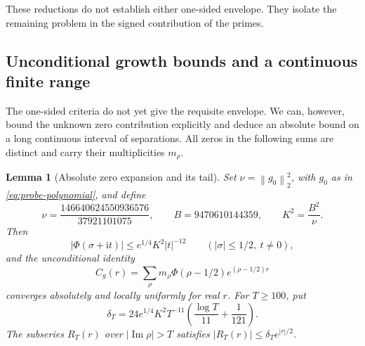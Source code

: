 \documentclass[11pt]{article}
\numberwithin{equation}{section}
\newtheorem{lemma}[theorem]{Lemma}
\theoremstyle{definition}
\theoremstyle{remark}
\newcommand{\Ima}{\operatorname{Im}}
\newcommand{\ii}{\mathrm i}
\newcommand{\norm}[1]{\left\lVert #1\right\rVert}
\begin{document}
These reductions do not establish either one-sided envelope. They
isolate the remaining problem in the signed contribution of the primes.


\subsection{Unconditional growth bounds and a continuous finite range}
\label{sec:probe-unconditional-growth}

The one-sided criteria do not yet give the requisite envelope. We can,
however, bound the unknown zero contribution explicitly and deduce an
absolute bound on a long continuous interval of separations. All zeros in
the following sums are distinct and carry their multiplicities \(m_\rho\).

\begin{lemma}[Absolute zero expansion and its tail]
\label{lem:probe-zero-tail}
Set \(\nu=\norm{g_0}_2^2\), with \(g_0\) as in
\eqref{eq:probe-polynomial}, and define
\begin{equation}\label{eq:probe-tail-constants}
\nu=\frac{146640624550936576}{37921101075},\qquad
B=9470610144359,\qquad K^2=\frac{B^2}{\nu}.
\end{equation}
Then
\begin{equation}\label{eq:probe-transform-decay}
|\Phi(\sigma+\ii t)|\le e^{1/4}K^2|t|^{-12}
\qquad(|\sigma|\le1/2,\ t\ne0),
\end{equation}
and the unconditional identity
\begin{equation}\label{eq:probe-full-covariance}
C_g(r)=\sum_\rho m_\rho\Phi(\rho-1/2)e^{(\rho-1/2)r}
\end{equation}
converges absolutely and locally uniformly for real \(r\).
For \(T\ge100\), put
\begin{equation}\label{eq:probe-delta-tail}
\delta_T=24e^{1/4}K^2T^{-11}
\left(\frac{\log T}{11}+\frac1{121}\right).
\end{equation}
The subseries \(R_T(r)\) over \(|\Ima\rho|>T\) satisfies
\(|R_T(r)|\le\delta_Te^{|r|/2}\).
\end{lemma}
\end{document}

